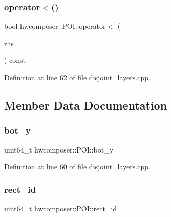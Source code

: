 \subsubsection{\texorpdfstring{operator$<$()}{operator<()}}
{\footnotesize\ttfamily bool hwcomposer\+::\+P\+O\+I\+::operator$<$ (\begin{DoxyParamCaption}\item[{const \mbox{\hyperlink{structhwcomposer_1_1POI}{P\+OI}} \&}]{rhs }\end{DoxyParamCaption}) const\hspace{0.3cm}{\ttfamily [inline]}}



Definition at line 62 of file disjoint\+\_\+layers.\+cpp.


\begin{DoxyCode}{0}
\end{DoxyCode}


\subsection{Member Data Documentation}
\mbox{\label{structhwcomposer_1_1POI_ab1986e724a142f17db1f4acf94eaff7a}} 
\subsubsection{\texorpdfstring{bot\+\_\+y}{bot\_y}}
{\footnotesize\ttfamily uint64\+\_\+t hwcomposer\+::\+P\+O\+I\+::bot\+\_\+y}



Definition at line 60 of file disjoint\+\_\+layers.\+cpp.

\mbox{\label{structhwcomposer_1_1POI_a1140eb53d6ffdc71b5964b60d112ece3}} 
\subsubsection{\texorpdfstring{rect\+\_\+id}{rect\_id}}
{\footnotesize\ttfamily uint64\+\_\+t hwcomposer\+::\+P\+O\+I\+::rect\+\_\+id}



